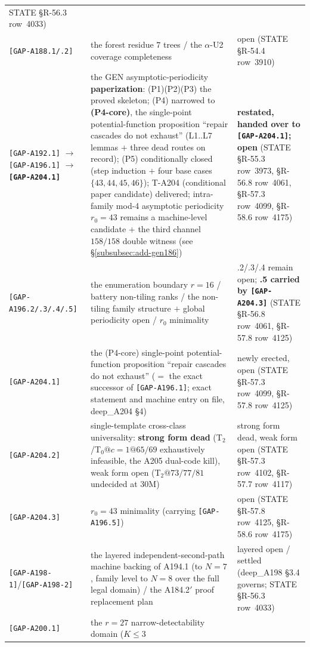 \begin{longtable}{p{}p{}p{}}
STATE \S R-56.3 row~4033) \\
\texttt{[GAP-A188.1/.2]} & the forest residue $7$ trees / the
$\alpha$-U2 coverage completeness & open (STATE \S R-54.4 row~3910) \\
\texttt{[GAP-A192.1]} $\to$ \texttt{[GAP-A196.1]} $\to$
\textbf{\texttt{[GAP-A204.1]}} & the GEN asymptotic-periodicity
\textbf{paperization}: (P1)(P2)(P3) the proved skeleton; (P4) narrowed to
\textbf{(P4-core)}, the single-point potential-function proposition ``repair
cascades do not exhaust'' (L1..L7 lemmas $+$ three dead routes on record);
(P5) conditionally closed (step induction $+$ four base cases
$\{43,44,45,46\}$); T-A204 (conditional paper candidate) delivered;
intra-family mod-4 asymptotic periodicity $r_0=43$ remains a machine-level
candidate $+$ the third channel $158/158$ double witness (see
\S\ref{subsubsec:add-gen186}) & \textbf{restated, handed over to
\texttt{[GAP-A204.1]}; open} (STATE \S R-55.3 row~3973, \S R-56.8 row~4061,
\S R-57.3 row~4099, \S R-58.6 row~4175) \\
\texttt{[GAP-A196.2/.3/.4/.5]} & the enumeration boundary $r=16$ / battery
non-tiling ranks / the non-tiling family structure $+$ global periodicity
open / $r_0$ minimality & .2/.3/.4 remain open; \textbf{.5 carried by
\texttt{[GAP-A204.3]}} (STATE \S R-56.8 row~4061, \S R-57.8 row~4125) \\
\texttt{[GAP-A204.1]} & the (P4-core) single-point potential-function
proposition ``repair cascades do not exhaust'' ($=$ the exact successor of
\texttt{[GAP-A196.1]}; exact statement and machine entry on file, deep\_A204
\S4) & newly erected, open (STATE \S R-57.3 row~4099, \S R-57.8 row~4125) \\
\texttt{[GAP-A204.2]} & single-template cross-class universality:
\textbf{strong form dead} (T$_2$/T$_0@c=1@65/69$ exhaustively infeasible,
the A205 dual-code kill), weak form open (T$_2@73/77/81$ undecided at 30M) &
strong form dead, weak form open (STATE \S R-57.3 row~4102, \S R-57.7
row~4117) \\
\texttt{[GAP-A204.3]} & $r_0=43$ minimality (carrying
\texttt{[GAP-A196.5]}) & open (STATE \S R-57.8 row~4125, \S R-58.6
row~4175) \\
\texttt{[GAP-A198-1]}/\texttt{[GAP-A198-2]} & the layered
independent-second-path machine backing of A194.1 (to $N=7$, family level to
$N=8$ over the full legal domain) / the A184.2$'$ proof replacement plan &
layered open / settled (deep\_A198 \S3.4 governs; STATE \S R-56.3 row~4033) \\
\texttt{[GAP-A200.1]} & the $r=27$ narrow-detectability domain ($K\le3$

\end{longtable}
